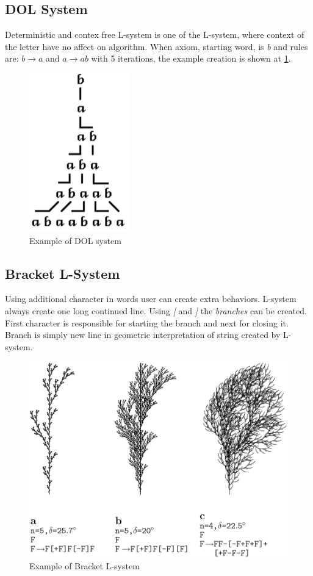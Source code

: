\documentclass[b5paper,twoside,11pt]{article}
\begin{document}
\subsection{DOL System}
Deterministic and contex free L-system is one of the L-system, where context of the letter have no affect on algorithm. When axiom, starting word, is \textit{b} and rules are: $b \rightarrow a$ and $a \rightarrow ab$ with 5 iterations, the example creation is shown at \figurename\ref{DOL}.

\begin{figure}[!htp]
\centering
  \includegraphics[width=0.15\linewidth]{DOL-system}
\caption{Example of DOL system\cite{prusinABOP} \label{DOL}}
\end{figure}
\FloatBarrier
\subsection{Bracket L-System}
Using additional character in words user can create extra behaviors. L-system always create one long continued line. Using \textit{[} and \textit{]} the \textit{branches} can be created. First character is responsible for starting the branch and next for closing it. Branch is simply new line in geometric interpretation of string created by L-system.
\begin{figure}[!htp]
\centering
  \includegraphics[width=0.7\linewidth]{branchingL}
\caption{Example of Bracket L-system\cite{prusinABOP} \label{branchingL}}
\end{figure}
\end{document}
